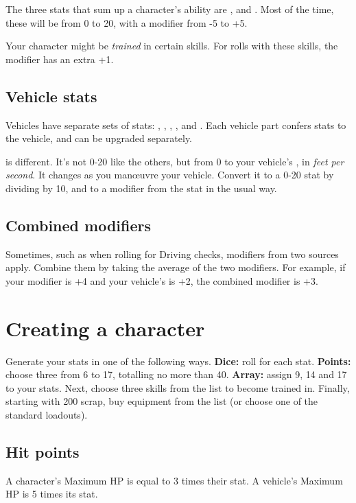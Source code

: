 \documentclass[10pt, a4paper, twocolumn]{article}
\begin{document}
The three stats that sum up a character's ability are ,
 and . Most of the time, these will be from 0 to 20, with
a modifier from -5 to +5. 

Your character might be \emph{trained} in certain skills. For rolls with these
skills, the modifier has an extra +1.

\subsection{Vehicle stats}
Vehicles have separate sets of stats: , ,
, ,  and . Each
vehicle part confers stats to the vehicle, and can be upgraded separately. 

 is different. It's not 0-20 like the others, but from 0 to your
vehicle's , in \emph{feet per second}. It changes as you
man\oe{}uvre your vehicle. Convert it to a 0-20 stat by dividing by 10, and to a
modifier from the stat in the usual way.

\subsection{Combined modifiers}
Sometimes, such as when rolling for Driving checks, modifiers from two sources
apply. Combine them by taking the average of the two modifiers. For example, if
your  modifier is +4 and your vehicle's  is +2, the
combined modifier is +3.

\section{Creating a character}
Generate your stats in one of the following ways. \textbf{Dice:} roll 
for each stat. \textbf{Points:} choose three from 6 to 17, totalling no more
than 40. \textbf{Array:} assign 9, 14 and 17 to your stats. Next, choose three
skills from the list to become trained in. Finally, starting with 200 scrap, buy
equipment from the list (or choose one of the standard loadouts).

\subsection{Hit points}
A character's Maximum HP is equal to 3 times their  stat. A
vehicle's Maximum HP is 5 times its  stat.
\end{document}
